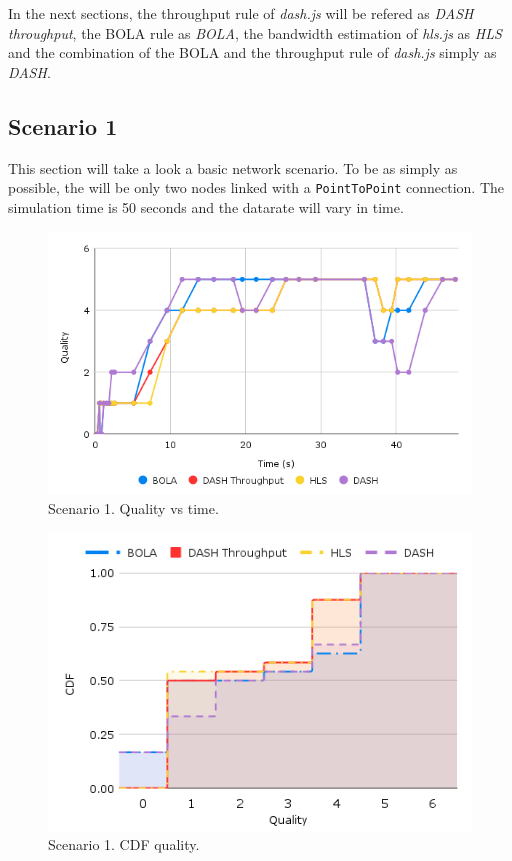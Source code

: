 In the next sections, the throughput rule of \textit{dash.js} will be refered as \textit{DASH throughput},
the BOLA rule as \textit{BOLA}, the bandwidth estimation of \textit{hls.js} as \textit{HLS} and the combination
of the BOLA and the throughput rule of \textit{dash.js} simply as \textit{DASH}.

\subsection{Scenario 1}
This section will take a look a basic network scenario. To be as simply as possible, the will be 
only two nodes linked with a \texttt{PointToPoint} connection. The simulation time is 50 seconds 
and the datarate will vary in time.

\begin{figure}[]
    \centering
    \includegraphics[width=\textwidth]{img/s1c1.png}
    \caption{Scenario 1. Quality vs time.}
    \label{fig:s1c1}
\end{figure}

\begin{figure}[]
    \centering
    \includegraphics[width=\textwidth]{img/s1c2.png}
    \caption{Scenario 1. CDF quality.}
    \label{fig:s1c1}
\end{figure}


